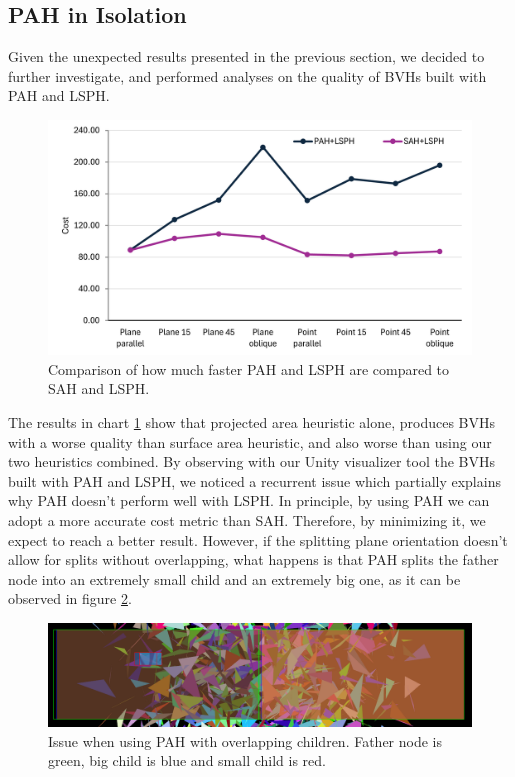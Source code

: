\documentclass{PoliMi_MasterThesis}
\begin{document}
\subsection{PAH in Isolation} \label{ssec:pah_isolation}
Given the unexpected results presented in the previous section, we decided to further investigate, and performed analyses on the quality of BVHs built with PAH and LSPH.

\begin{figure}[H] 
	\centering
	\includegraphics[width=\textwidth]{Images/pah_isolation.png}
	\caption{Comparison of how much faster PAH and LSPH are compared to SAH and LSPH.}
	\label{fig:pah_isolation}
\end{figure}

The results in chart \ref{fig:pah_isolation} show that projected area heuristic alone, produces BVHs with a worse quality than surface area heuristic, and also worse than using our two heuristics combined. By observing with our Unity visualizer tool the BVHs built with PAH and LSPH, we noticed a recurrent issue which partially explains why PAH doesn't perform well with LSPH. In principle, by using PAH we can adopt a more accurate cost metric than SAH. Therefore, by minimizing it, we expect to reach a better result. However, if the splitting plane orientation doesn't allow for splits without overlapping, what happens is that PAH splits the father node into an extremely small child and an extremely big one, as it can be observed in figure \ref{fig:pah_overlapping_children_figure}.

\begin{figure}[H] 
	\centering
	\includegraphics[width=\textwidth*\real{0.9}]{Images/overlapping_children.png}
	\caption{Issue when using PAH with overlapping children. Father node is green, big child is blue and small child is red.}
	\label{fig:pah_overlapping_children_figure}
\end{figure} 
\end{document}
